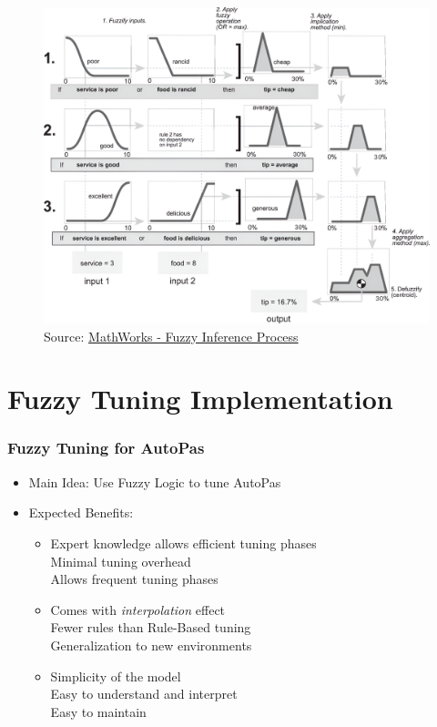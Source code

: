 \documentclass[
	10pt,
	t		%
]{beamer}
\newcommand{\cmark}{\ding{51}}%
\begin{document}
\begin{frame}
	\vspace{-0.8cm}
	\begin{figure}
		\centering
		\caption{\tiny{Source: \href{https://de.mathworks.com/help/fuzzy/fuzzy-inference-process.html}{MathWorks - Fuzzy Inference Process}}}
		\includegraphics[width=0.8\paperwidth]{figures/FullInferenceProcess.png}
	\end{figure}
	\label{fig:fuzzy_inference_full}

\end{frame}


\section{Fuzzy Tuning Implementation}
\begin{frame}
	\frametitle{Fuzzy Tuning for AutoPas}

	\begin{itemize}
		\item Main Idea: Use Fuzzy Logic to tune AutoPas
		\item Expected Benefits:
		      \begin{itemize}
			      \item Expert knowledge allows efficient tuning phases\\
			            \quad \cmark \; Minimal tuning overhead \\
			            \quad \cmark \; Allows frequent tuning phases
			      \item Comes with \textit{interpolation} effect\\
			            \quad \cmark \; Fewer rules than Rule-Based tuning \\
			            \quad \cmark \; Generalization to new environments
			      \item Simplicity of the model\\
			            \quad \cmark \; Easy to understand and interpret\\
			            \quad \cmark \; Easy to maintain
		      \end{itemize}
	\end{itemize}
\end{frame}
\end{document}
